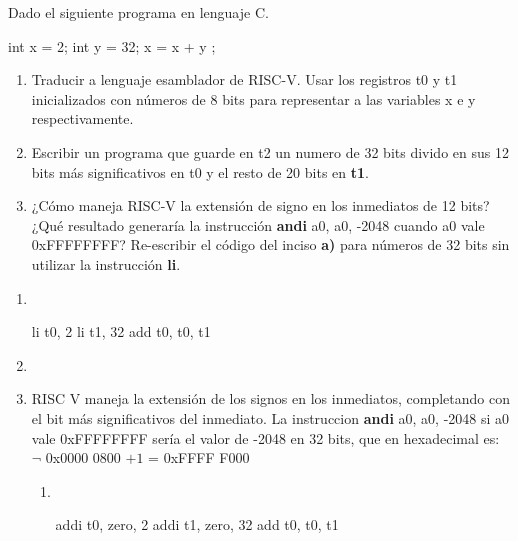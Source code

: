 \begin{enunciado}{\ejercicio}
  Dado el siguiente programa en lenguaje C.
  \begin{cLang}[linewidth=6cm]
int x = 2;
int y = 32;
x = x + y ;
  \end{cLang}

  \begin{enumerate}[label=\alph*)]
    \item Traducir a lenguaje esamblador de RISC-V. Usar los registros t0 y t1 inicializados con
          números de 8 bits para representar a las variables x e y respectivamente.

    \item  Escribir un programa que guarde en t2 un numero de 32 bits divido en sus 12 bits más
          significativos en t0 y el resto de 20 bits en \textbf{t1}.

    \item ¿Cómo maneja RISC-V la extensión de signo en los inmediatos de 12 bits? ¿Qué resultado
          generaría la instrucción  \textbf{andi} a0, a0, -2048 cuando a0 vale 0xFFFFFFFF? Re-escribir
          el código del inciso  \textbf{a)} para números de 32 bits sin utilizar la instrucción  \textbf{li}.
  \end{enumerate}
\end{enunciado}

\begin{enumerate}[label=\alph*)]
  \item \
        \begin{center}
          \begin{riscv}[linewidth=6cm]
li t0, 2
li t1, 32
add t0, t0, t1
          \end{riscv}
        \end{center}
  \item \hacer
  \item RISC V maneja la extensión de los signos en los inmediatos, completando con el bit más significativos
        del inmediato.
        La instruccion \textbf{andi} a0, a0, -2048 si a0 vale 0xFFFFFFFF sería el valor de -2048 en 32 bits, que  en
        hexadecimal es:  $\neg$ 0x0000 0800 $+ 1$ = 0xFFFF F000

        \begin{enumerate}
          \item  \ 
\begin{riscv}
addi t0, zero, 2
addi t1, zero, 32
add t0, t0, t1
                \end{riscv}
        \end{enumerate}
\end{enumerate}
